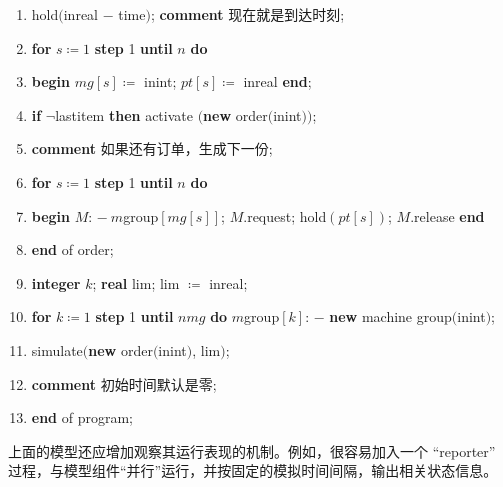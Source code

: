 \documentclass[twoside,11pt,fontset=none]{ctexbook}
\begin{document}
\begin{enumerate}[nosep, label=\arabic*.]
	\item \label{pg:program-job-shop-15}
	\quad hold$($inreal $-$ time$)$; \textbf{comment} 现在就是到达时刻;
	
	\item \label{pg:program-job-shop-16}
	\quad \textbf{for} $s\coloneq 1$ \textbf{step} 1 \textbf{until} $n$ \textbf{do}
	
	\item \label{pg:program-job-shop-17}
	\quad \textbf{begin} $mg[s]\coloneq$ inint; $pt[s]\coloneq$ inreal \textbf{end};
	
	\item \label{pg:program-job-shop-18}
	\quad \textbf{if} $\neg$lastitem \textbf{then} activate $($\textbf{new} order$($inint$))$;
	
	\item \label{pg:program-job-shop-19}
	\quad \textbf{comment} 如果还有订单，生成下一份;
	
	\item \label{pg:program-job-shop-20}
	\quad \textbf{for} $s\coloneq 1$ \textbf{step} 1 \textbf{until} $n$ \textbf{do}
	
	\item \label{pg:program-job-shop-21}
	\quad \textbf{begin} $M$: $-\ m$group$[mg[s]]$; $M$.request; hold$(pt[s])$; $M$.release \textbf{end}
	
	\item \label{pg:program-job-shop-22}
	\textbf{end} of order;
	
	\item \label{pg:program-job-shop-23}
	\textbf{integer} $k$; \textbf{real} lim; lim $\coloneq$ inreal;
	
	\item \label{pg:program-job-shop-24}
	\textbf{for} $k\coloneq 1$ \textbf{step} 1 \textbf{until} $nmg$ \textbf{do} $m$group$[k]$: $-$ \textbf{new} machine group$($inint$)$;
	
	\item \label{pg:program-job-shop-25}
	simulate$($\textbf{new} order$($inint$)$, lim$)$;
	
	\item \label{pg:program-job-shop-26}
	\textbf{comment} 初始时间默认是零;
	
	\item \label{pg:program-job-shop-27}
	\textbf{end} of program;
\end{enumerate}

上面的模型还应增加观察其运行表现的机制。例如，很容易加入一个 ``reporter'' 过程，与模型组件“并行”运行，并按固定的模拟时间间隔，输出相关状态信息。
\end{document}
